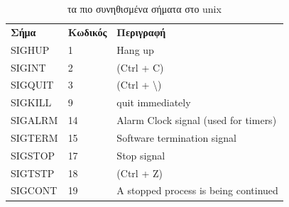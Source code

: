 \documentclass[DIV=calc, paper=a4, fontsize=10pt, twocolumn]{scrartcl}	 %
\begin{document}
\begin{center}
\begin{table}[h]
\small
\begin{tabularx}{\textwidth}{l|l|l}
\rowcolor[gray]{0.9}
  \textbf{Σήμα} & \textbf{Κωδικός} &  \textbf{Περιγραφή} \\
SIGHUP  &1	&Hang up\\
SIGINT	&2	& (Ctrl + C)\\
SIGQUIT	&3	& (Ctrl + \textbackslash)\\
SIGKILL	&9	&quit immediately\\
SIGALRM	&14	&Alarm Clock signal (used for timers)\\
SIGTERM	&15	&Software termination signal \\
SIGSTOP	&17	&Stop signal\\
SIGTSTP	&18	& (Ctrl + Z)\\
SIGCONT	&19	&A stopped process is being continued\\
\end{tabularx}  
\caption{τα πιο συνηθισμένα σήματα στο unix} 
\label{tab:signals}          
\end{table}
\end{center}
\end{document}
